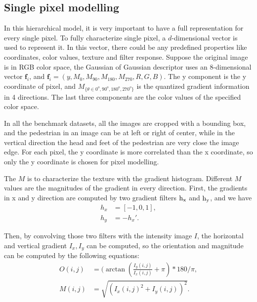 \subsection{Single pixel modelling}

In this hierarchical model, it is very important to have a full representation for every single pixel. To fully characterize single pixel, a $d$-dimensional vector is used to represent it. In this vector, there could be any predefined properties like coordinates, color values, texture and filter response. Suppose the original image is in RGB color space, the Gaussian of Gaussian descriptor uses an 8-dimensional vector $\bm{f}_i$, and 
$\bm{f}_i = (y,M_0,M_{90},M_{180},M_{270},R,G,B)$.
The y component is the y coordinate of pixel, and $M_{\{{\theta}\in{0^o,90^o,180^o,270^o}\}}$ is the quantized gradient information in 4 directions. The last three components are the color values of the specified color space.

In all the benchmark datasets, all the images are cropped with a bounding box, and the pedestrian in an image can be at left or right of center, while in the vertical direction the head and feet of the pedestrian are very close the image edge. For each pixel, the y coordinate is more correlated than the x coordinate, so only the y coordinate is chosen for pixel modelling. 

The $M$ is to characterize the texture with the gradient histogram. Different $M$ values are the magnitudes of the gradient in every direction. 
First, the gradients in x and y direction are computed by two gradient filters $\rm{h}_x$ and $\rm{h}_y$, and we have 
\begin{equation}
\begin{aligned}
h_x &= [-1, 0, 1],\\
h_y &= -h_x'.
\end{aligned}
\end{equation}

Then, by convolving those two filters with the intensity image $I$, the horizontal and vertical gradient $I_x, I_y$ can be computed, so the orientation and magnitude can be computed by the following equations:
\begin{equation}
\begin{aligned}
O(i,j) &= (\arctan(\frac{I_y(i,j)}{I_x(i,j)}+\pi)*180 /{\pi}, \\
M(i,j) &= \sqrt{(I_x(i,j)^2 + I_y(i,j))^2}.
\end{aligned}
\end{equation}

